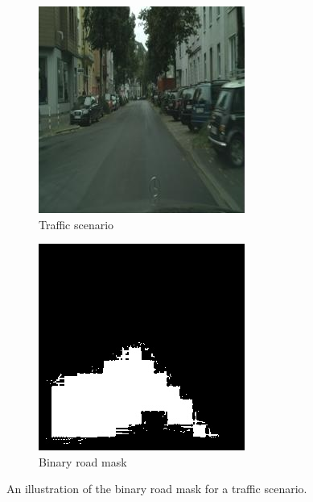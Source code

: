 \documentclass[letterpaper, 10 pt, conference]{ieeeconf}  %
\begin{document}
\begin{figure}
\centering
\begin{subfigure}{0.20\textwidth}
    \includegraphics[width=\textwidth]{road_image_example.jpg}
    \caption{Traffic scenario}
    \label{road:image}
\end{subfigure}
\hfill
\begin{subfigure}{0.20\textwidth}
    \includegraphics[width=\textwidth]{road_mask_example.jpg}
    \caption{Binary road mask}
    \label{road:mask}
\end{subfigure}
\hfill        
\caption{An illustration of the binary road mask for a traffic scenario.}
\label{road:detection}
\end{figure}
\end{document}

